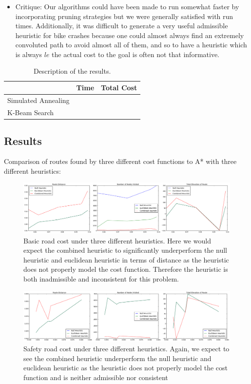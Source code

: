 \documentclass[11pt]{article}
\begin{document}
\begin{itemize}
\item{Critique:} Our algorithms could have been made to run somewhat faster by incorporating pruning strategies but we were generally satisfied with run times. Additionally, it was difficult to generate a very useful admissible heuristic for bike crashes because one could almost always find an extremely convoluted path to avoid almost all of them, and so to have a heuristic which is always $le$ the actual cost to the goal is often not that informative.

\end{itemize}

\begin{table}[H]
  \centering
  \begin{tabular}{lll}
    \toprule
    & Time & Total Cost \\
    \midrule 
    Simulated Annealing & &\\
    K-Beam Search & &\\
    \bottomrule
  \end{tabular}
  \caption{Description of the results.}
\end{table}


\subsection{Results}

Comparison of routes found by three different cost functions to A* with three different heuristics: \\

\begin{figure}[H]
\caption{Basic road cost under three different heuristics. Here we would expect the combined heuristic to significantly underperform the null heuristic and euclidean heuristic in terms of distance as the heuristic does not properly model the cost function. Therefore the heuristic is both inadmissible and inconsistent for this problem. }
\includegraphics[width=1\textwidth]{../images/cost_1.png}
\end{figure}

\begin{figure}[H]
\caption{Safety road cost under three different heuristics. Again, we expect to see the combined heuristic underperform the null heuristic and euclidean heuristic as the heuristic does not properly model the cost function and is neither admissible nor consistent }
\includegraphics[width=1\textwidth]{../images/cost_2.png}
\end{figure}
\end{document}
